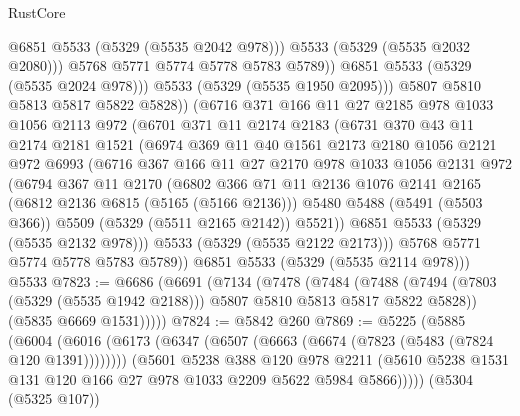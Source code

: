\begin{lexlean}{RustCore}
\begin{coremodule}
                    @6851
                    @5533
                    (@5329 (@5535 @2042 @978)))
                  @5533
                  (@5329 (@5535 @2032 @2080)))
                @5768
                @5771
                @5774
                @5778
                @5783
                @5789))
            @6851
            @5533
            (@5329 (@5535 @2024 @978)))
          @5533
          (@5329 (@5535 @1950 @2095)))
        @5807
        @5810
        @5813
        @5817
        @5822
        @5828))
    (@6716
      @371
      @166
      @11
      @27
      @2185
      @978
      @1033
      @1056
      @2113
      @972
      (@6701
        @371
        @11
        @2174
        @2183
        (@6731
          @370
          @43
          @11
          @2174
          @2181
          @1521
          (@6974
            @369
            @11
            @40
            @1561
            @2173
            @2180
            @1056
            @2121
            @972
            @6993
            (@6716
              @367
              @166
              @11
              @27
              @2170
              @978
              @1033
              @1056
              @2131
              @972
              (@6794
                @367
                @11
                @2170
                (@6802
                  @366
                  @71
                  @11
                  @2136
                  @1076
                  @2141
                  @2165
                  (@6812 @2136 @6815 (@5165 (@5166 @2136)))
                  @5480
                  @5488
                  (@5491 (@5503 @366))
                  @5509
                  (@5329 (@5511 @2165 @2142))
                  @5521))
              @6851
              @5533
              (@5329 (@5535 @2132 @978)))
            @5533
            (@5329 (@5535 @2122 @2173)))
          @5768
          @5771
          @5774
          @5778
          @5783
          @5789))
      @6851
      @5533
      (@5329 (@5535 @2114 @978)))
    @5533
@7823 := @6686
    (@6691
      (@7134
        (@7478
          (@7484
            (@7488 (@7494 (@7803 (@5329 (@5535 @1942 @2188))) @5807 @5810 @5813 @5817 @5822 @5828))
            (@5835 @6669 @1531)))))
@7824 := @5842 @260
@7869 := @5225
    (@5885
      (@6004
        (@6016
          (@6173 (@6347 (@6507 (@6663 (@6674 (@7823 (@5483 (@7824 @120 @1391))))))))
          (@5601
            @5238
            @388
            @120
            @978
            @2211
            (@5610 @5238 @1531 @131 @120 @166 @27 @978 @1033 @2209 @5622 @5984 @5866)))))
    (@5304 (@5325 @107))

\end{coremodule}
\end{lexlean}
